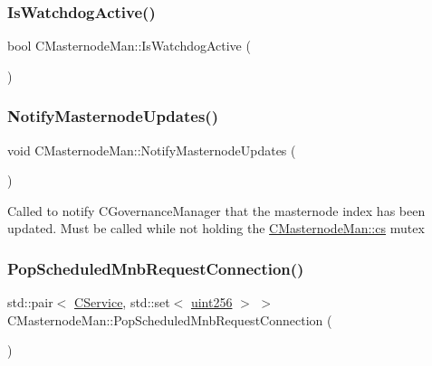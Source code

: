 \mbox{\label{class_c_masternode_man_a4c21658a2440fdae9f25fe09c384537d}} 
\subsubsection{\texorpdfstring{Is\+Watchdog\+Active()}{IsWatchdogActive()}}
{\footnotesize\ttfamily bool C\+Masternode\+Man\+::\+Is\+Watchdog\+Active (\begin{DoxyParamCaption}{ }\end{DoxyParamCaption})}

\mbox{\label{class_c_masternode_man_a3c832df5227f690dd8461aecb73a52b0}} 
\subsubsection{\texorpdfstring{Notify\+Masternode\+Updates()}{NotifyMasternodeUpdates()}}
{\footnotesize\ttfamily void C\+Masternode\+Man\+::\+Notify\+Masternode\+Updates (\begin{DoxyParamCaption}{ }\end{DoxyParamCaption})}

Called to notify C\+Governance\+Manager that the masternode index has been updated. Must be called while not holding the \mbox{\hyperlink{class_c_masternode_man_aba950f06d6e446ee01277d54aab64916}{C\+Masternode\+Man\+::cs}} mutex \mbox{\label{class_c_masternode_man_ac3691f1c70af48026fc9c3bbb69197ee}} 
\subsubsection{\texorpdfstring{Pop\+Scheduled\+Mnb\+Request\+Connection()}{PopScheduledMnbRequestConnection()}}
{\footnotesize\ttfamily std\+::pair$<$ \mbox{\hyperlink{class_c_service}{C\+Service}}, std\+::set$<$ \mbox{\hyperlink{classuint256}{uint256}} $>$ $>$ C\+Masternode\+Man\+::\+Pop\+Scheduled\+Mnb\+Request\+Connection (\begin{DoxyParamCaption}{ }\end{DoxyParamCaption})}

